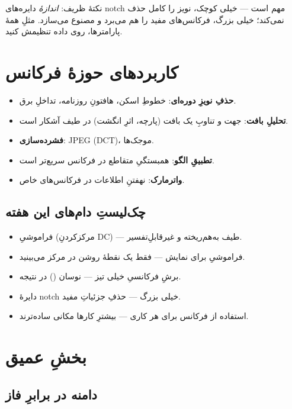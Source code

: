 \documentclass[12pt,a4paper]{article}
\begin{document}
\begin{nokte}
نکتهٔ ظریف: \emph{اندازهٔ} دایره‌های notch مهم است — خیلی کوچک، نویز را کامل حذف نمی‌کند؛ خیلی
بزرگ، فرکانس‌های مفید را هم می‌برد و مصنوع می‌سازد. مثلِ همهٔ پارامترها، روی داده تنظیمش کنید.
\end{nokte}

\section{کاربردهای حوزهٔ فرکانس}

\begin{itemize}
  \item \textbf{حذفِ نویزِ دوره‌ای}: خطوطِ اسکن، هافتونِ روزنامه، تداخلِ برق.
  \item \textbf{تحلیلِ بافت}: جهت و تناوبِ یک بافت (پارچه، اثرِ انگشت) در طیف آشکار است.
  \item \textbf{فشرده‌سازی}: JPEG (DCT)، موجک‌ها.
  \item \textbf{تطبیقِ الگو}: همبستگیِ متقاطع در فرکانس سریع‌تر است.
  \item \textbf{واترمارک}: نهفتنِ اطلاعات در فرکانس‌های خاص.
\end{itemize}

\subsection*{چک‌لیستِ دام‌های این هفته}

\begin{itemize}
  \item فراموشیِ  (مرکزکردنِ DC) — طیف به‌هم‌ریخته و غیرقابلِ‌تفسیر.
  \item فراموشیِ  برای نمایش — فقط یک نقطهٔ روشن در مرکز می‌بینید.
  \item برشِ فرکانسیِ خیلی تیز — نوسان () در نتیجه.
  \item دایرهٔ notchِ خیلی بزرگ — حذفِ جزئیاتِ مفید.
  \item استفاده از فرکانس برای هر کاری — بیشترِ کارها مکانی ساده‌ترند.
\end{itemize}

\section{بخشِ عمیق}

\subsection{دامنه در برابرِ فاز}
\end{document}
